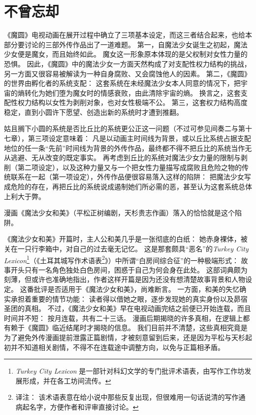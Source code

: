 \chapter[不曾忘却]{不曾忘却}


《魔圆》电视动画在展开过程中确立了三项基本设定，而这三者结合起来，也给本部分要讨论的三部外传作品出了一道难题。
第一，自魔法少女诞生之初起，魔法少女便是魔女，而且始终如此。
魔女这一形象原本体现的是父权制对女性力量的恐惧\cite{gilbert1979snow-white}。
因此，《魔圆》中的魔法少女一方面天然构成了对支配性权力结构的挑战，另一方面又很容易被解读为一种自身腐败、又会腐蚀他人的因素。
第二，《魔圆》的世界由孵化者的系统支配：
这套系统在未经魔法少女本人同意的情况下，把宇宙的熵转化为她们堕为魔女时的情感衰败，由此清除宇宙的熵。
换言之，这套支配性权力结构以女性为剥削对象，也对女性极端不公。
第三，这套权力结构高度稳定，直到小圆许下愿望、创造出新的系统时才遭到推翻。

姑且搁下小圆的系统是否比丘比的系统更公正这一问题（不过可参见间奏二与第十七章），第三项设定意味着：
凡是以动画主时间线为背景，或以丘比系统占据支配地位的任一条“先前”时间线为背景的外传作品，最终都不得不把丘比的系统当作无从逃避、无从改变的既定事实。
再考虑到丘比的系统对魔法少女力量的限制与剥削（第二项设定），以及这种力量又与一个把女性力量描写成腐败且危险之物的传统联系在一起（第一项设定），外传作品便很容易落入这样的陷阱：
把魔法少女写成危险的存在，再把丘比的系统说成遏制她们所必需的恶，甚至认为这套系统总体上利大于弊。

漫画《魔法少女和美》（平松正树编剧，天杉贵志作画）落入的恰恰就是这个陷阱。

《魔法少女和美》开篇时，主人公和美几乎是一张彻底的白纸：
她赤身裸体，被关在一只行李箱中，对自己的过去毫无记忆。
这是那套颇具“恶名”的\emph{Turkey City Lexicon}\footnote{%
    \emph{Turkey City Lexicon} 是一部针对科幻文学的专门批评术语表，由写作工作坊发展形成，并在各工坊间流传。
}（《土耳其城写作术语表\footnote{%
    译注：
    该术语表意在给小说中那些反复出现，但很难用一句话说清的写作通病起名字，方便作者和评审直接讨论。
}》）\cite{shiner-sterling2009turkey-city}中所谓“白房间综合征”的一种极端形式：
故事开头只有一名角色独处白色房间，困惑于自己为何会身在此处。
这部词典颇为刻薄，但或许也准确地指出，作者这样开篇是因为还没有想清楚故事背景和人物设定。
这番批评是否适用于《魔法少女和美》，尚难断言。
一方面，和美的失忆确实承担着重要的情节功能：
读者得以借她之眼，逐步发现她的真实身份以及昴宿圣团的真相。
不过，《魔法少女和美》早在电视动画完结之前便已开始连载，而且时间并不短：
按月连载，共有二十三话。
漫画后期揭晓的许多真相，在逻辑上都有赖于《魔圆》临近结尾时才揭晓的信息。
我们目前并不清楚，这些真相究竟是为了避免外传漫画提前泄露正篇剧情，才被刻意留到后来，还是因为平松与天杉起初并不知道相关剧情，不得不在连载途中调整方向，以免与正篇相矛盾。

